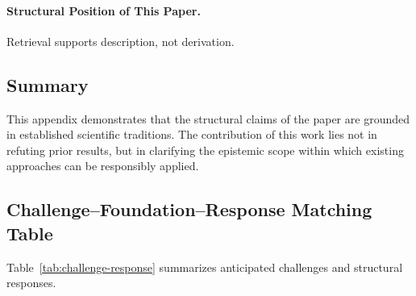 \paragraph{Structural Position of This Paper.}
Retrieval supports description, not derivation.


\subsection{Summary}

This appendix demonstrates that the structural claims of the paper are grounded in established scientific traditions. The contribution of this work lies not in refuting prior results, but in clarifying the epistemic scope within which existing approaches can be responsibly applied.


\subsection{Challenge--Foundation--Response Matching Table}

Table~\ref{tab:challenge-response} summarizes anticipated challenges and structural responses.

